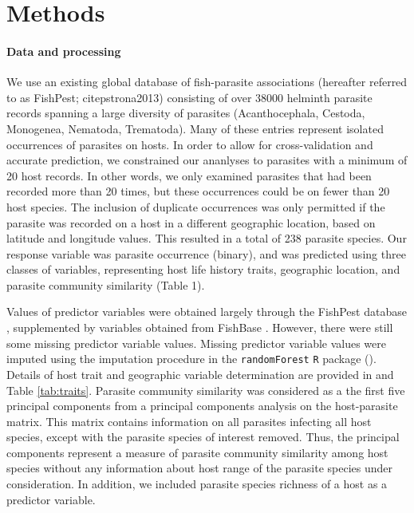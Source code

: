 \documentclass[12pt]{article}
\begin{document}


 
\section*{Methods}
 \paragraph{Data and processing}
  We use an existing global database of fish-parasite associations (hereafter referred to as FishPest; citep{strona2013}) consisting of over 38000 helminth parasite records spanning a large diversity of parasites (Acanthocephala, Cestoda, Monogenea, Nematoda, Trematoda). Many of these entries represent isolated occurrences of parasites on hosts. In order to allow for cross-validation and accurate prediction, we constrained our ananlyses to parasites with a minimum of 20 host records. In other words, we only examined parasites that had been recorded more than 20 times, but these occurrences could be on fewer than 20 host species. The inclusion of duplicate occurrences was only permitted if the parasite was recorded on a host in a different geographic location, based on latitude and longitude values. This resulted in a total of 238 parasite species. Our response variable was parasite occurrence (binary), and was predicted using three classes of variables, representing host life history traits, geographic location, and parasite community similarity (Table 1). 
  
  Values of predictor variables were obtained largely through the FishPest database \cite{strona2012, strona2013}, supplemented by variables obtained from FishBase \cite{froese2010}. However, there were still some missing predictor variable values. Missing predictor variable values were imputed using the imputation procedure in the \texttt{randomForest} \texttt{R} package (\cite{randomForest}). Details of host trait and geographic variable determination are provided in \cite{strona2013} and Table \ref{tab:traits}. Parasite community similarity was considered as a the first five principal components from a principal components analysis on the host-parasite matrix. This matrix contains information on all parasites infecting all host species, except with the parasite species of interest removed. Thus, the principal components represent a measure of parasite community similarity among host species without any information about host range of the parasite species under consideration. In addition, we included parasite species richness of a host as a predictor variable.   
  
\end{document}
